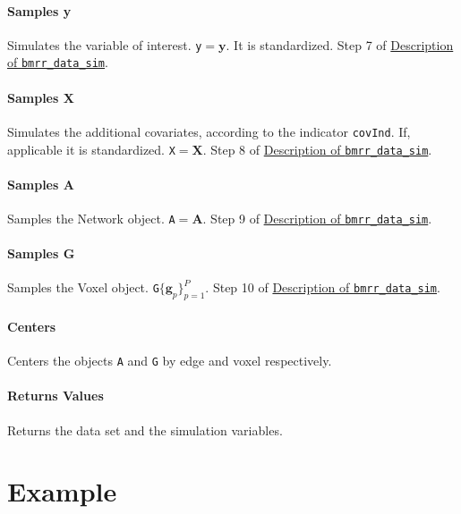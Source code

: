 \documentclass[
]{article}
\begin{document}
\paragraph{Samples y}\label{samples-y}

Simulates the variable of interest. \texttt{y}\(= {\boldsymbol y} \). It is standardized.
Step 7 of \hyperref[data_sim_description]{Description of \texttt{bmrr\_data\_sim}}.

\paragraph{Samples X}\label{samples-x}

Simulates the additional covariates, according to the indicator \texttt{covInd}. If,
applicable it is standardized. \texttt{X}\(= {\boldsymbol X} \).
Step 8 of \hyperref[data_sim_description]{Description of \texttt{bmrr\_data\_sim}}.

\paragraph{Samples A}\label{samples-a}

Samples the Network object. \texttt{A}\(= {\boldsymbol A} \).
Step 9 of \hyperref[data_sim_description]{Description of \texttt{bmrr\_data\_sim}}.

\paragraph{Samples G}\label{samples-g}

Samples the Voxel object. \texttt{G}\(\{ {\boldsymbol g} _p\}_{p=1}^P\).
Step 10 of \hyperref[data_sim_description]{Description of \texttt{bmrr\_data\_sim}}.

\paragraph{Centers}\label{centers}

Centers the objects \texttt{A} and \texttt{G} by edge and voxel respectively.

\paragraph{Returns Values}\label{returns-values-2}

Returns the data set and the simulation variables.

\section{Example}\label{example}
\end{document}
